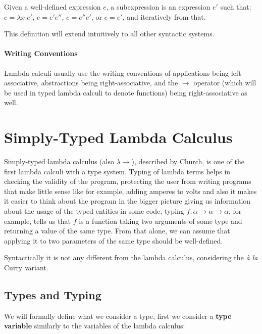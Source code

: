 \begin{defn}[Subexpression]
Given a well-defined expression $e$, a subexpression is an expression $e'$ such that: $e = \lambda x . e'$, $e = e' e''$, $e = e'' e'$, or $e = e'$, and iteratively from that.
\end{defn}

This definition will extend intuitively to all other syntactic systems.

\paragraph{Writing Conventions}

Lambda calculi usually use the writing conventions of applications being left-associative, abstractions being right-associative, and the $\rightarrow$ operator (which will be used in typed lambda calculi to denote functions) being right-associative as well.

\section{Simply-Typed Lambda Calculus }

Simply-typed lambda calculus (also $\lambda\rightarrow$), described by Church, is one of the first lambda calculi with a type system. Typing of lambda terms helps in checking the validity of the program, protecting the user from writing programs that make little sense like for example, adding amperes to volts \cite{barendregt1992lambda} and also it makes it easier to think about the program in the bigger picture giving us information about the usage of the typed entities in some code, typing $f : \alpha \rightarrow \alpha \rightarrow \alpha$, for example, tells us that $f$ is a function taking two arguments of some type and returning a value of the same type. From that alone, we can assume that applying it to two parameters of the same type should be well-defined.

Syntactically it is not any different from the lambda calculus, considering the \emph{\`a la} Curry variant. \cite{barendregt1992lambda}

\subsection{Types and Typing}

We will formally define what we consider a type, first we consider a \textbf{type variable} similarly to the variables of the lambda calculus:

